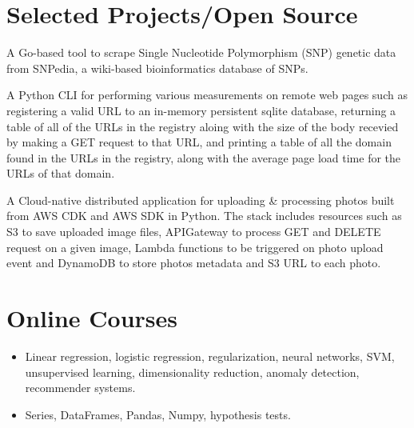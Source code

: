 \documentclass[11pt,a4paper,sans]{moderncv}
\begin{document}
\section{\textbf{Selected Projects/Open Source}}

  {A Go-based tool to scrape Single Nucleotide Polymorphism (SNP) genetic data from SNPedia, a wiki-based bioinformatics database of SNPs.}

  {A Python CLI for performing various measurements on remote web pages such as registering a valid URL to an in-memory persistent sqlite database, returning a table of all of the URLs in the registry aloing with the size of the body recevied by making a GET request to that URL, and printing a table of all the domain found in the URLs in the registry, along with the average page load time for the URLs of that domain.}

  {A Cloud-native distributed application for uploading \& processing photos built from AWS CDK and AWS SDK in Python. The stack includes resources such as S3 to save uploaded image files, APIGateway to process GET and DELETE request on a given image, Lambda functions to be triggered on photo upload event and DynamoDB to store photos metadata and S3 URL to each photo.}

\section{\textbf{Online Courses}}
{ \begin{itemize} \itemsep -1pt
   \item Linear regression, logistic regression, regularization, neural networks, SVM, unsupervised learning, dimensionality reduction, anomaly detection, recommender systems. 
\end{itemize}}

   { \begin{itemize} 
	\item Series, DataFrames, Pandas, Numpy, hypothesis tests.
\end{itemize} }
\end{document}
